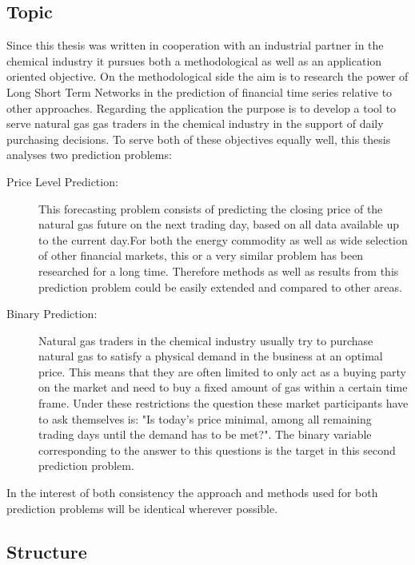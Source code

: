 \subsection{Topic}
Since this thesis was written in cooperation with an industrial partner in the chemical industry it pursues both a methodological as well as an application oriented objective. On the methodological side the aim is to research the power of Long Short Term Networks in the prediction of financial time series relative to other approaches. Regarding the application the purpose is to develop a tool to serve natural gas gas traders in the chemical industry in the support of daily purchasing decisions. To serve both of these objectives equally well, this thesis analyses two prediction problems:
\begin{description}
\item[Price Level Prediction:] This forecasting problem consists of predicting the closing price of the natural gas future on the next trading day, based on all data available up to the current day.For both the energy commodity as well as wide selection of other financial markets, this or a very similar problem has been researched for a long time. Therefore methods as well as results from this prediction problem could be easily extended and compared to other areas.
\item[Binary Prediction:] Natural gas traders in the chemical industry usually try to purchase natural gas to satisfy a physical demand in the business at an optimal price. This means that they are often limited to only act as a buying party on the market and need to buy a fixed amount of gas within a certain time frame. Under these restrictions the question these market participants have to ask themselves is: "Is today's price minimal, among all remaining trading days until the demand has to be met?". The binary variable corresponding to the answer to this questions is the target in this second prediction problem.
\end{description}
In the interest of both consistency the approach and methods used for both prediction problems will be identical wherever possible.
\subsection{Structure}